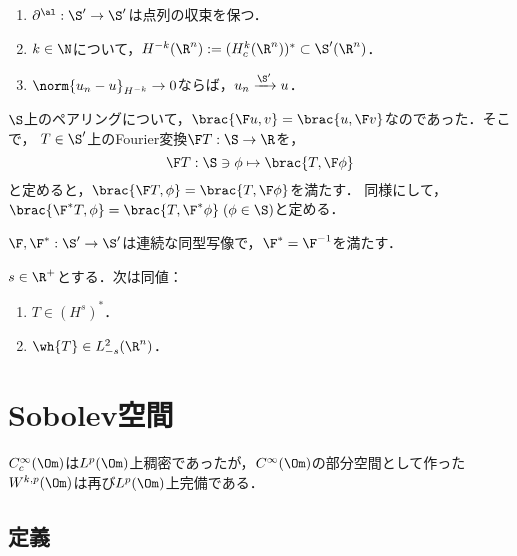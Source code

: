 \documentclass[uplatex, dvipdfmx]{jsreport}
\begin{document}
\begin{proposition}\mbox{}
    \begin{enumerate}
        \item $\partial^\al:\S'\to\S'$は点列の収束を保つ．
        \item $k\in\N$について，$H^{-k}(\R^n):=(H^k_c(\R^n))^*\subset\S'(\R^n)$．
        \item $\norm{u_n-u}_{H^{-k}}\to0$ならば，$u_n\xrightarrow{\S'}u$．
    \end{enumerate}
\end{proposition}

\begin{definition}
    $\S$上のペアリングについて，$\brac{\F u,v}=\brac{u,\F v}$なのであった．そこで，
    $T\in\S'$上のFourier変換$\F T:\S\to\R$を，
    \[\F T:\S\ni\phi\mapsto\brac{T,\F\phi}\]
    と定めると，$\brac{\F T,\phi}=\brac{T,\F\phi}$を満たす．
    同様にして，$\brac{\F^*T,\phi}=\brac{T,\F^*\phi}\;(\phi\in\S)$と定める．
\end{definition}

\begin{theorem}
    $\F,\F^*:\S'\to\S'$は連続な同型写像で，$\F^*=\F^{-1}$を満たす．
\end{theorem}

\begin{proposition}
    $s\in\R^+$とする．次は同値：
    \begin{enumerate}
        \item $T\in(H^s)^*$．
        \item $\wh{T}\in L^2_{-s}(\R^n)$．
    \end{enumerate}
\end{proposition}

\section{Sobolev空間}

\begin{tcolorbox}[colframe=ForestGreen, colback=ForestGreen!10!white,breakable,colbacktitle=ForestGreen!40!white,coltitle=black,fonttitle=\bfseries\sffamily,
title=]
    $C_c^\infty(\Om)$は$L^p(\Om)$上稠密であったが，$C^\infty(\Om)$の部分空間として作った$W^{k,p}(\Om)$は再び$L^p(\Om)$上完備である．
\end{tcolorbox}

\subsection{定義}
\end{document}
